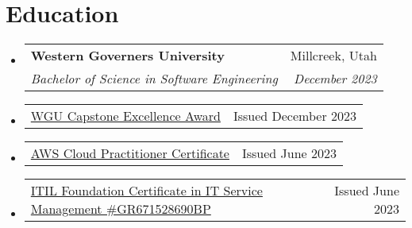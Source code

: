 \documentclass[letterpaper,11pt]{article}
\makeatletter
\newcommand{\resumeSubheading}[4]{
  \vspace{-2pt}\item
    \begin{tabular*}{0.97\textwidth}[t]{l@{\extracolsep{\fill}}r}
      \textbf{#1} & #2 \\
      \textit{\small#3} & \textit{\small #4} \\
    \end{tabular*}\vspace{-7pt}
}
\newcommand{\resumeSubheadingCondensed}[2]{
  \item
    {\small \begin{tabular*}{0.97\textwidth}[t]{l@{\extracolsep{\fill}}r}
      #1 & #2 \\
    \end{tabular*}}\vspace{-7pt}
}
\newcommand{\resumeSubHeadingListStart}{\begin{itemize}[leftmargin=0.15in, label={}]}
\newcommand{\resumeSubHeadingListEnd}{\end{itemize}}
\makeatother
\begin{document}
\section{Education}
\resumeSubHeadingListStart
  \resumeSubheading
    {Western Governers University}{Millcreek, Utah}
    {Bachelor of Science in  Software Engineering}{December 2023}\vspace{5pt}
  \resumeSubheadingCondensed
    {\href{https://api.badgr.io/public/assertions/vaoUfjA0RT6cZ6-0HZxO3w}{\textcolor{primary}{WGU Capstone Excellence Award}}}{Issued December 2023}
  \resumeSubheadingCondensed
    {\href{https://www.credly.com/badges/a5febee5-016a-4ce3-a014-b824422519a3/public_url}{\textcolor{primary}{AWS Cloud Practitioner Certificate}}}{Issued June 2023}
  \resumeSubheadingCondensed
    {\href{https://www.peoplecert.org/for-corporations/certificate-verification-service}{\textcolor{primary}{ITIL Foundation Certificate in IT Service Management \#GR671528690BP}}}{Issued June 2023}
    
\resumeSubHeadingListEnd

\end{document}
